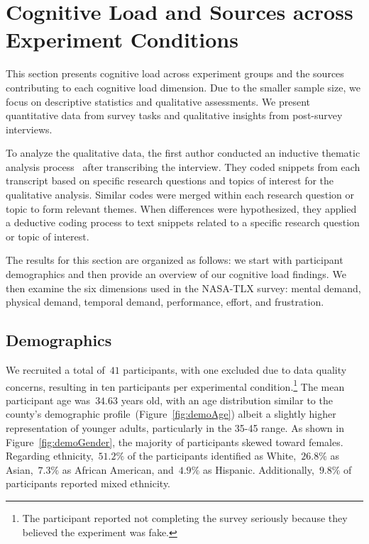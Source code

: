 \section{Cognitive Load and Sources across Experiment Conditions}
\label{sec:cog_result}
This section presents cognitive load across experiment groups and the sources contributing to each cognitive load dimension. Due to the smaller sample size, we focus on descriptive statistics and qualitative assessments. We present quantitative data from survey tasks and qualitative insights from post-survey interviews.

To analyze the qualitative data, the first author conducted an inductive thematic analysis process~\cite{olsonWaysKnowingHCI2014} after transcribing the interview. They coded snippets from each transcript based on specific research questions and topics of interest for the qualitative analysis. Similar codes were merged within each research question or topic to form relevant themes. When differences were hypothesized, they applied a deductive coding process to text snippets related to a specific research question or topic of interest.

The results for this section are organized as follows: we start with participant demographics and then provide an overview of our cognitive load findings. We then examine the six dimensions used in the NASA-TLX survey: mental demand, physical demand, temporal demand, performance, effort, and frustration.

\subsection{Demographics}
We recruited a total of~$41$ participants, with one excluded due to data quality concerns, resulting in ten participants per experimental condition.\footnote{The participant reported not completing the survey seriously because they believed the experiment was fake.} The mean participant age was~$34.63$ years old, with an age distribution similar to the county's demographic profile~(Figure~\ref{fig:demoAge}) albeit a slightly higher representation of younger adults, particularly in the 35-45 range. As shown in Figure~\ref{fig:demoGender}, the majority of participants skewed toward females. Regarding ethnicity,~$51.2\%$ of the participants identified as White,~$26.8\%$ as Asian,~$7.3\%$ as African American, and~$4.9\%$ as Hispanic. Additionally,~$9.8\%$ of participants reported mixed ethnicity.

